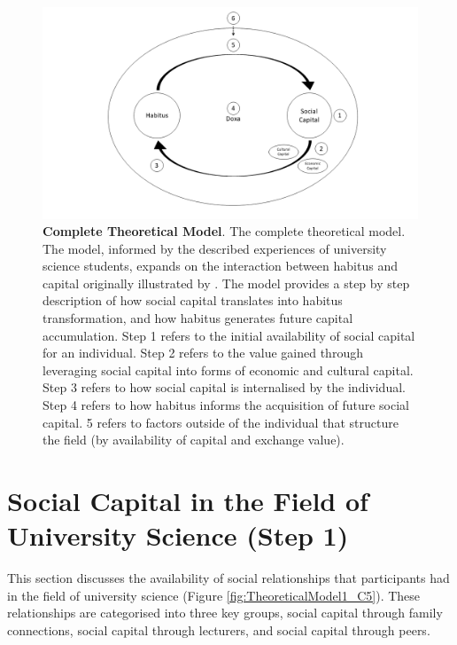 \begin{figure}[ht]
\centering
\includegraphics[width=\textwidth]{C5 - Understanding Capital Accumulation/HabitusSocCap_TheoreticalModel.png}
\caption{\label{fig:TheoreticalModel_C5}\textbf{Complete Theoretical Model}. The complete theoretical model. The model, informed by the described experiences of university science students, expands on the interaction between habitus and capital originally illustrated by \cite{Bourdieu1984}. The model provides a step by step description of how social capital translates into habitus transformation, and how habitus generates future capital accumulation. Step 1 refers to the initial availability of social capital for an individual. Step 2 refers to the value gained through leveraging social capital into forms of economic and cultural capital. Step 3 refers to how social capital is internalised by the individual. Step 4 refers to how habitus informs the acquisition of future social capital. 5 refers to factors outside of the individual that structure the field (by availability of capital and exchange value).}
\end{figure}

\section{Social Capital in the Field of University Science (Step 1)}
This section discusses the availability of social relationships that participants had in the field of university science (Figure \ref{fig:TheoreticalModel1_C5}). These relationships are categorised into three key groups, social capital through family connections, social capital through lecturers, and social capital through peers. 

